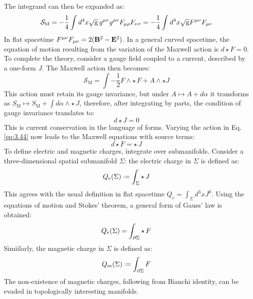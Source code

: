 The integrand can then be expanded as:
\begin{equation*}
  \mathcal{S}_{\text{M}} = - \frac{1}{4} \int d^4 x \sqrt{\mathrm{g}}\, g^{\mu \nu} g^{\rho \sigma} F_{\mu \rho} F_{\nu \sigma} = - \frac{1}{4} \int d^4 x \sqrt{\mathrm{g}} F^{\mu \nu} F_{\mu \nu}
\end{equation*}
In flat spacetime $ F^{\mu \nu} F_{\mu \nu} = 2 (\mathbf{B}^2 - \mathbf{E}^2) $. In a general curved spacetime, the equation of motion resulting from the variation of the Maxwell action is $ d \star F = 0 $.\\
To complete the theory, consider a gauge field coupled to a current, described by a one-form $ J $. The Maxwell action then becomes:
\begin{equation}
  \mathcal{S}_{\text{M}} = \int - \frac{1}{2} F \wedge \star\, F + A \wedge \star J
  \label{eq:3.45}
\end{equation}
This action must retain its gauge invariance, but under $ A \mapsto A + d\alpha $ it transforms as $ S_{\text{M}} \mapsto S_{\text{M}} + \int d\alpha \wedge \star\, J $, therefore, after integrating by parts, the condition of gauge invariance translates to:
\begin{equation}
  d \star J = 0
  \label{eq:3.46}
\end{equation}
This is current conservation in the language of forms. Varying the action in Eq. \ref{eq:3.44} now leads to the Maxwell equations with source terms:
\begin{equation}
  d \star F = \star\, J
  \label{eq:3.47}
\end{equation}
To define electric and magnetic charges, integrate over submanifolds. Consider a three-dimensional spatial submanifold $ \Sigma $: the electric charge in $ \Sigma $ is defined as:
\begin{equation}
  Q_e(\Sigma) \defeq \int_{\Sigma} \star\, J
  \label{eq:3.48}
\end{equation}
This agrees with the usual definition in flat spacetime $ Q_e = \int_{\Sigma} d^3 x J^0 $. Using the equations of motion and Stokes' theorem, a general form of Gauss' law is obtained:
\begin{equation}
  Q_e(\Sigma) = \int_{\partial \Sigma} \star\, F
  \label{eq:3.49}
\end{equation}
Simiilarly, the magnetic charge in $ \Sigma $ is defined as:
\begin{equation}
  Q_m(\Sigma) \defeq \int_{\pa \Sigma} F
  \label{eq:3.50}
\end{equation}
The non-existence of magnetic charges, following from Bianchi identity, can be evaded in topologically interesting manifolds.\\

